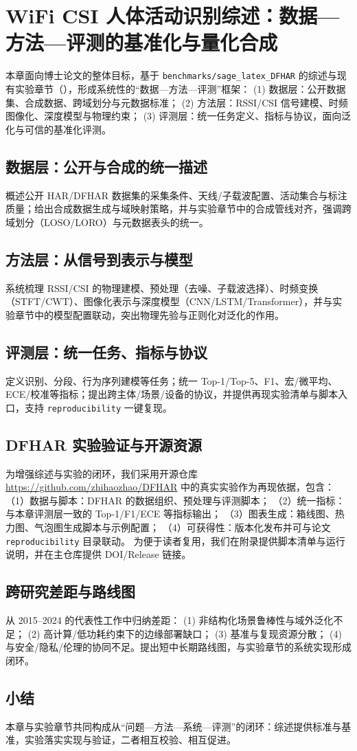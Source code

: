 \chapter{WiFi CSI 人体活动识别综述：数据—方法—评测的基准化与量化合成}
\label{chap:review}

本章面向博士论文的整体目标，基于 \texttt{benchmarks/sage\_latex\_DFHAR} 的综述与现有实验章节（），形成系统性的“数据—方法—评测”框架：
(1) 数据层：公开数据集、合成数据、跨域划分与元数据标准；
(2) 方法层：RSSI/CSI 信号建模、时频图像化、深度模型与物理约束；
(3) 评测层：统一任务定义、指标与协议，面向泛化与可信的基准化评测。

\section{数据层：公开与合成的统一描述}
概述公开 HAR/DFHAR 数据集的采集条件、天线/子载波配置、活动集合与标注质量；给出合成数据生成与域映射策略，并与实验章节中的合成管线对齐，强调跨域划分（LOSO/LORO）与元数据表头的统一。

\section{方法层：从信号到表示与模型}
系统梳理 RSSI/CSI 的物理建模、预处理（去噪、子载波选择）、时频变换（STFT/CWT）、图像化表示与深度模型（CNN/LSTM/Transformer），并与实验章节中的模型配置联动，突出物理先验与正则化对泛化的作用。

\section{评测层：统一任务、指标与协议}
定义识别、分段、行为序列建模等任务；统一 Top-1/Top-5、F1、宏/微平均、ECE/校准等指标；提出跨主体/场景/设备的协议，并提供再现实验清单与脚本入口，支持 \texttt{reproducibility} 一键复现。

\section{DFHAR 实验验证与开源资源}
为增强综述与实验的闭环，我们采用开源仓库 \url{https://github.com/zhihaozhao/DFHAR} 中的真实实验作为再现依据，包含：
（1）数据与脚本：DFHAR 的数据组织、预处理与评测脚本；
（2）统一指标：与本章评测层一致的 Top-1/F1/ECE 等指标输出；
（3）图表生成：箱线图、热力图、气泡图生成脚本与示例配置；
（4）可获得性：版本化发布并可与论文 \texttt{reproducibility} 目录联动。
为便于读者复用，我们在附录提供脚本清单与运行说明，并在主仓库提供 DOI/Release 链接。

\section{跨研究差距与路线图}
从 2015–2024 的代表性工作中归纳差距：
(1) 非结构化场景鲁棒性与域外泛化不足；
(2) 高计算/低功耗约束下的边缘部署缺口；
(3) 基准与复现资源分散；
(4) 与安全/隐私/伦理的协同不足。提出短中长期路线图，与实验章节的系统实现形成闭环。

\section{小结}
本章与实验章节共同构成从“问题—方法—系统—评测”的闭环：综述提供标准与基准，实验落实实现与验证，二者相互校验、相互促进。
